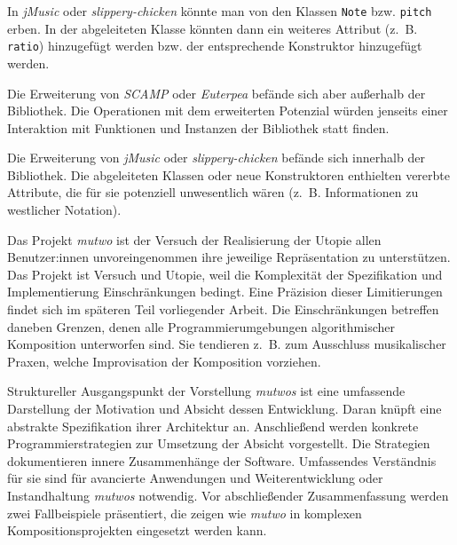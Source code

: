\documentclass[12pt,a4paper,ngerman]{article}
\begin{document}
In \emph{jMusic} oder \emph{slippery-chicken} könnte man von den Klassen \texttt{Note} bzw. \texttt{pitch} erben.
In der abgeleiteten Klasse könnten dann ein weiteres Attribut (z.~B. \texttt{ratio}) hinzugefügt werden bzw. der entsprechende Konstruktor hinzugefügt werden.

\smallskip

Die Erweiterung von \emph{SCAMP} oder \emph{Euterpea} befände sich aber außerhalb der Bibliothek.
Die Operationen mit dem erweiterten Potenzial würden jenseits einer Interaktion mit Funktionen und Instanzen der Bibliothek statt finden.

\smallskip

Die Erweiterung von \emph{jMusic} oder \emph{slippery-chicken} befände sich innerhalb der Bibliothek.
Die abgeleiteten Klassen oder neue Konstruktoren enthielten vererbte Attribute, die für sie potenziell unwesentlich wären (z.~B. Informationen zu westlicher Notation).

\bigskip

Das Projekt \emph{mutwo} ist der Versuch der Realisierung der Utopie allen Benutzer:innen unvoreingenommen ihre jeweilige Repräsentation zu unterstützen.
Das Projekt ist Versuch und Utopie, weil die Komplexität der Spezifikation und Implementierung Einschränkungen bedingt.
Eine Präzision dieser Limitierungen findet sich im späteren Teil vorliegender Arbeit.
Die Einschränkungen betreffen daneben Grenzen, denen alle Programmierumgebungen algorithmischer Komposition unterworfen sind.
Sie tendieren z.~B. zum Ausschluss musikalischer Praxen, welche Improvisation der Komposition vorziehen.

\bigskip



Struktureller Ausgangspunkt der Vorstellung \emph{mutwos} ist eine umfassende Darstellung der Motivation und Absicht dessen Entwicklung.
Daran knüpft eine abstrakte Spezifikation ihrer Architektur an.
Anschließend werden konkrete Programmierstrategien zur Umsetzung der Absicht vorgestellt.
Die Strategien dokumentieren innere Zusammenhänge der Software.
Umfassendes Verständnis für sie sind für avancierte Anwendungen und Weiterentwicklung oder Instandhaltung \emph{mutwos} notwendig.
Vor abschließender Zusammenfassung werden zwei Fallbeispiele präsentiert, die zeigen wie \emph{mutwo} in komplexen Kompositionsprojekten eingesetzt werden kann.
\end{document}
